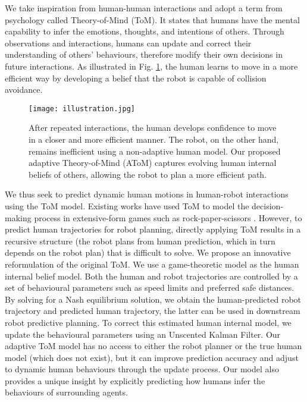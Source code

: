 We take inspiration from human-human interactions and adopt a term from psychology called Theory-of-Mind (ToM). It states that humans have the mental capability to infer the emotions, thoughts, and intentions of others. 
Through observations and interactions, humans can update and correct their understanding of others' behaviours, therefore modify their own decisions in future interactions. 
As illustrated in Fig. \ref{fig:illustration}, the human learns to move in a more efficient way by developing a belief that the robot is capable of collision avoidance.

\begin{figure}
    \centering
    \texttt{[image: illustration.jpg]}
    \vspace{-7mm}
    \caption{After repeated interactions, the human develops confidence to move in a closer and more efficient manner. The robot, on the other hand, remains inefficient using a non-adaptive human model. Our proposed adaptive Theory-of-Mind (AToM) captures evolving human internal beliefs of others, allowing the robot to plan a more efficient path.}
    \vspace{-7mm}
    \label{fig:illustration}
\end{figure}

We thus seek to predict dynamic human motions in human-robot interactions using the ToM model. Existing works have used ToM to model the decision-making process in extensive-form games such as rock-paper-scissors \cite{de2013much}. 
However, to predict human trajectories for robot planning, directly applying ToM results in a recursive structure (the robot plans from human prediction, which in turn depends on the robot plan) that is difficult to solve. 
We propose an innovative reformulation of the original ToM. We use a game-theoretic model as the human internal belief model. 
Both the human and robot trajectories are controlled by a set of behavioural parameters such as speed limits and preferred safe distances. 
By solving for a Nash equilibrium solution, we obtain the human-predicted robot trajectory and predicted human trajectory, the latter can be used in downstream robot predictive planning. 
To correct this estimated human internal model, we update the behavioural parameters using an Unscented Kalman Filter. 
Our adaptive ToM model has no access to either the robot planner or the true human model (which does not exist), but it can improve prediction accuracy and adjust to dynamic human behaviours through the update process. 
Our model also provides a unique insight by explicitly predicting how humans infer the behaviours of surrounding agents.

